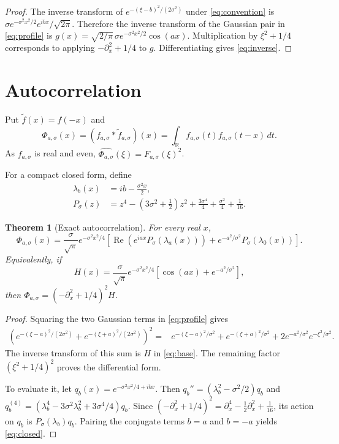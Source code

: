 \documentclass[11pt]{article}
\newtheorem{theorem}{Theorem}
\newcommand{\R}{\mathbb{R}}
\newcommand{\PhiA}{\Phi_{a,\sigma}}
\begin{document}
\begin{proof}
The inverse transform of $e^{-(\xi-b)^2/(2\sigma^2)}$ under
\eqref{eq:convention} is
$\sigma e^{-\sigma^2x^2/2}e^{ibx}/\sqrt{2\pi}$.
Therefore the inverse transform of the Gaussian pair in
\eqref{eq:profile} is
$g(x)=\sqrt{2/\pi}\,\sigma e^{-\sigma^2x^2/2}\cos(ax)$.
Multiplication by $\xi^2+1/4$ corresponds to applying
$-\partial_x^2+1/4$ to $g$. Differentiating gives
\eqref{eq:inverse}.
\end{proof}

\section{Autocorrelation}

Put $\widetilde f(x)=f(-x)$ and
\begin{equation}\label{eq:autocorrelation}
  \PhiA(x)=(f_{a,\sigma}*\widetilde f_{a,\sigma})(x)
  =\int_{\R}f_{a,\sigma}(t)f_{a,\sigma}(t-x)\,dt.
\end{equation}
As $f_{a,\sigma}$ is real and even,
$\widehat{\PhiA}(\xi)=F_{a,\sigma}(\xi)^2$.

For a compact closed form, define
\begin{align}\label{eq:polynomial}
  \lambda_b(x)&=ib-\frac{\sigma^2x}{2},\\
  P_\sigma(z)&=z^4-\left(3\sigma^2+\frac12\right)z^2
       +\frac{3\sigma^4}{4}+\frac{\sigma^2}{4}+\frac1{16}.
\end{align}

\begin{theorem}[Exact autocorrelation]\label{thm:auto}
For every real $x$,
\begin{equation}\label{eq:closed}
  \PhiA(x)=\frac{\sigma}{\sqrt\pi}e^{-\sigma^2x^2/4}
  \left[
    \operatorname{Re}\!\left(e^{iax}P_\sigma(\lambda_a(x))\right)
    +e^{-a^2/\sigma^2}P_\sigma(\lambda_0(x))
  \right].
\end{equation}
Equivalently, if
\begin{equation}\label{eq:base}
  H(x)=\frac{\sigma}{\sqrt\pi}e^{-\sigma^2x^2/4}
             \left[\cos(ax)+e^{-a^2/\sigma^2}\right],
\end{equation}
then $\PhiA=(-\partial_x^2+1/4)^2H$.
\end{theorem}

\begin{proof}
Squaring the two Gaussian terms in \eqref{eq:profile} gives
\begin{align*}
\left(e^{-(\xi-a)^2/(2\sigma^2)}
     +e^{-(\xi+a)^2/(2\sigma^2)}\right)^2
={}&e^{-(\xi-a)^2/\sigma^2}
    +e^{-(\xi+a)^2/\sigma^2}
    +2e^{-a^2/\sigma^2}e^{-\xi^2/\sigma^2}.
\end{align*}
The inverse transform of this sum is $H$ in \eqref{eq:base}.
The remaining factor $(\xi^2+1/4)^2$ proves the differential form.

To evaluate it, let
$q_b(x)=e^{-\sigma^2x^2/4+ibx}$. Then
$q_b''=(\lambda_b^2-\sigma^2/2)q_b$ and
$q_b^{(4)}=(\lambda_b^4-3\sigma^2\lambda_b^2
                  +3\sigma^4/4)q_b$.
Since $(-\partial_x^2+1/4)^2
=\partial_x^4-\tfrac12\partial_x^2+\tfrac1{16}$,
its action on $q_b$ is $P_\sigma(\lambda_b)q_b$.
Pairing the conjugate terms $b=a$ and $b=-a$ yields
\eqref{eq:closed}.
\end{proof}
\end{document}
